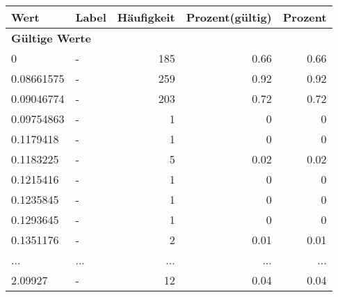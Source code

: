      \begin{longtable}{lXrrr}
     \toprule
     \textbf{Wert} & \textbf{Label} & \textbf{Häufigkeit} & \textbf{Prozent(gültig)} & \textbf{Prozent} \\
     \endhead
     \midrule
     \multicolumn{5}{l}{\textbf{Gültige Werte}}\\
        0 & \multicolumn{1}{X}{-} & %
          \num{185} &
          \num[round-mode=places,round-precision=2]{0.66} &
          \num[round-mode=places,round-precision=2]{0.66} \\
        0.08661575 & \multicolumn{1}{X}{-} & %
          \num{259} &
          \num[round-mode=places,round-precision=2]{0.92} &
          \num[round-mode=places,round-precision=2]{0.92} \\
        0.09046774 & \multicolumn{1}{X}{-} & %
          \num{203} &
          \num[round-mode=places,round-precision=2]{0.72} &
          \num[round-mode=places,round-precision=2]{0.72} \\
        0.09754863 & \multicolumn{1}{X}{-} & %
          \num{1} &
          \num[round-mode=places,round-precision=2]{0} &
          \num[round-mode=places,round-precision=2]{0} \\
        0.1179418 & \multicolumn{1}{X}{-} & %
          \num{1} &
          \num[round-mode=places,round-precision=2]{0} &
          \num[round-mode=places,round-precision=2]{0} \\
        0.1183225 & \multicolumn{1}{X}{-} & %
          \num{5} &
          \num[round-mode=places,round-precision=2]{0.02} &
          \num[round-mode=places,round-precision=2]{0.02} \\
        0.1215416 & \multicolumn{1}{X}{-} & %
          \num{1} &
          \num[round-mode=places,round-precision=2]{0} &
          \num[round-mode=places,round-precision=2]{0} \\
        0.1235845 & \multicolumn{1}{X}{-} & %
          \num{1} &
          \num[round-mode=places,round-precision=2]{0} &
          \num[round-mode=places,round-precision=2]{0} \\
        0.1293645 & \multicolumn{1}{X}{-} & %
          \num{1} &
          \num[round-mode=places,round-precision=2]{0} &
          \num[round-mode=places,round-precision=2]{0} \\
        0.1351176 & \multicolumn{1}{X}{-} & %
          \num{2} &
          \num[round-mode=places,round-precision=2]{0.01} &
          \num[round-mode=places,round-precision=2]{0.01} \\
       ... & ... & ... & ... & ... \\
        2.09927 & \multicolumn{1}{X}{-} & %
          \num{12} &
          \num[round-mode=places,round-precision=2]{0.04} &
          \num[round-mode=places,round-precision=2]{0.04} \\


\end{longtable}
